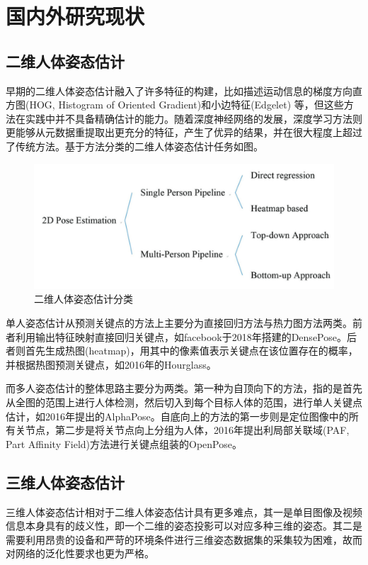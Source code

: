 \section{国内外研究现状}

\subsection{二维人体姿态估计}{}

早期的二维人体姿态估计融入了许多特征的构建，比如描述运动信息的梯度方向直方图(HOG, Histogram of Oriented Gradient)和小边特征(Edgelet)
等，但这些方法在实践中并不具备精确估计的能力。随着深度神经网络的发展，深度学习方法则更能够从元数据重提取出更充分的特征，产生了优异的结果，并在很大程度上超过了传统方法。基于方法分类的二维人体姿态估计任务如图。

\begin{figure}[h]
	\centering
	\includegraphics[scale=0.4]{figures/5.png}
	\caption{二维人体姿态估计分类}
	\label{fig:f5}
\end{figure}

单人姿态估计从预测关键点的方法上主要分为直接回归方法与热力图方法两类。前者利用输出特征映射直接回归关键点，如facebook于2018年搭建的DensePose。后者则首先生成热图(heatmap)，用其中的像素值表示关键点在该位置存在的概率，并根据热图预测关键点，如2016年的Hourglass。

而多人姿态估计的整体思路主要分为两类。第一种为自顶向下的方法，指的是首先从全图的范围上进行人体检测，然后切入到每个目标人体的范围，进行单人关键点估计，如2016年提出的AlphaPose。自底向上的方法的第一步则是定位图像中的所有关节点，第二步是将关节点向上分组为人体，2016年提出利局部关联域(PAF, Part Affinity Field)方法进行关键点组装的OpenPose。

\subsection{三维人体姿态估计}{}
三维人体姿态估计相对于二维人体姿态估计具有更多难点，其一是单目图像及视频信息本身具有的歧义性，即一个二维的姿态投影可以对应多种三维的姿态。其二是需要利用昂贵的设备和严苛的环境条件进行三维姿态数据集的采集较为困难，故而对网络的泛化性要求也更为严格。

